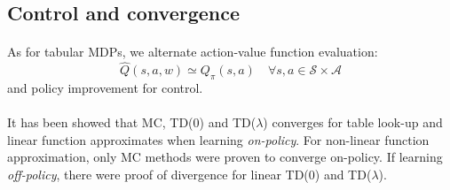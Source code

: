 \documentclass[a4paper]{article}
\begin{document}
{		\subsection{Control and convergence}
		{
			\paragraph{} As for tabular MDPs, we alternate action-value function evaluation:
				\begin{equation}
					\hat{Q}(s,a,w) \simeq Q_\pi(s,a) \quad \forall s,a \in \mathcal{S}\times\mathcal{A}
				\end{equation}
				and policy improvement for control. 
				
			\paragraph{} It has been showed that MC, TD(0) and TD($\lambda$) converges for table look-up and linear function approximates when learning \emph{on-policy}. For non-linear function approximation, only MC methods were proven to converge on-policy. If learning \emph{off-policy}, there were proof of divergence for linear TD(0) and TD($\lambda$).
		}
	}
	
\end{document}
